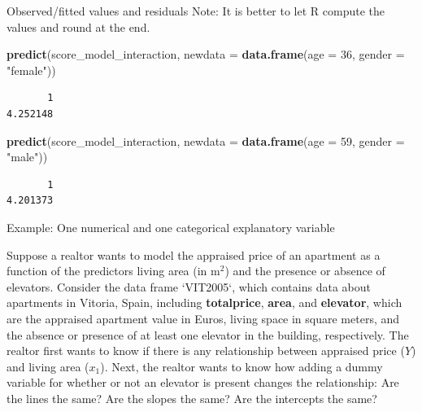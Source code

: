 \documentclass[
  ignorenonframetext,
]{beamer}
\newenvironment{Shaded}{\begin{snugshade}}{\end{snugshade}}
\newcommand{\AttributeTok}[1]{\textcolor[rgb]{0.13,0.29,0.53}{#1}}
\newcommand{\DecValTok}[1]{\textcolor[rgb]{0.00,0.00,0.81}{#1}}
\newcommand{\FunctionTok}[1]{\textcolor[rgb]{0.13,0.29,0.53}{\textbf{#1}}}
\newcommand{\NormalTok}[1]{#1}
\newcommand{\StringTok}[1]{\textcolor[rgb]{0.31,0.60,0.02}{#1}}
\begin{document}
\begin{frame}[fragile]{Observed/fitted values and residuals}
\label{observedfitted-values-and-residuals-3}
Note: It is better to let R compute the values and round at the end.

\normalsize

\begin{Shaded}
\begin{Highlighting}[]
\FunctionTok{predict}\NormalTok{(score\_model\_interaction, }
        \AttributeTok{newdata =} \FunctionTok{data.frame}\NormalTok{(}\AttributeTok{age =} \DecValTok{36}\NormalTok{, }\AttributeTok{gender =} \StringTok{"female"}\NormalTok{))}
\end{Highlighting}
\end{Shaded}

\begin{verbatim}
       1 
4.252148 
\end{verbatim}

\begin{Shaded}
\begin{Highlighting}[]
\FunctionTok{predict}\NormalTok{(score\_model\_interaction, }
        \AttributeTok{newdata =} \FunctionTok{data.frame}\NormalTok{(}\AttributeTok{age =} \DecValTok{59}\NormalTok{, }\AttributeTok{gender =} \StringTok{"male"}\NormalTok{))}
\end{Highlighting}
\end{Shaded}

\begin{verbatim}
       1 
4.201373 
\end{verbatim}

\normalsize
\end{frame}

\begin{frame}{Example: One numerical and one categorical explanatory
variable}
\label{example-one-numerical-and-one-categorical-explanatory-variable}
\begin{tcolorbox}
Suppose a realtor wants to model the appraised price of an apartment as a function of the predictors living area (in $\text{m}^2$) and the presence or absence of elevators. Consider the data frame `VIT2005`, which contains data about apartments in Vitoria, Spain, including \textbf{totalprice}, \textbf{area}, and \textbf{elevator}, which are the appraised apartment value in Euros, living space in square meters, and the absence or presence of at least one elevator in the building, respectively. The realtor first wants to know if there is any relationship between appraised price ($Y$) and living area ($x_1$). Next, the realtor wants to know how adding a dummy variable for whether or not an elevator is present changes the relationship: Are the lines the same? Are the slopes the same? Are the intercepts the same?
\end{tcolorbox}
\end{frame}
\end{document}
